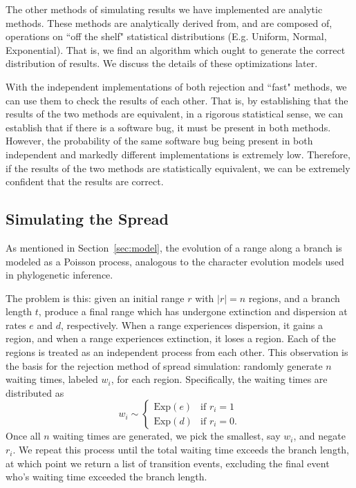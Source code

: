 \documentclass{article}
\begin{document}
The other methods of simulating results we have implemented are analytic
methods.
These methods are analytically derived from, and are composed of, operations on
``off the shelf" statistical distributions (E.g. Uniform, Normal, Exponential).
That is, we find an algorithm which ought to generate the correct distribution
of results.
We discuss the details of these optimizations later.

With the independent implementations of both rejection and ``fast" methods, we
can use them to check the results of each other.
That is, by establishing that the results of the two methods are equivalent, in
a rigorous statistical sense, we can establish that if there is a software bug,
it must be present in both methods.
However, the probability of the same software bug being present in both
independent and markedly different implementations is extremely low.
Therefore, if the results of the two methods are statistically equivalent, we
can be extremely confident that the results are correct.

\subsection{Simulating the Spread}

As mentioned in Section~\ref{sec:model}, the evolution of a range along a
branch is modeled as a Poisson process, analogous to the character evolution
models used in phylogenetic inference.

The problem is this: given an initial range \( r \) with \( |r| = n \) regions,
and a branch length \( t \), produce a final range which has undergone
extinction and dispersion at rates \( e \) and \( d \), respectively.
When a range experiences dispersion, it gains a region, and when a range
experiences extinction, it loses a region. 
Each of the regions is treated as an independent process from each other.
This observation is the basis for the rejection method of spread simulation:
randomly generate \( n \) waiting times, labeled \( w_i \), for each region.
Specifically, the waiting times are distributed as
\begin{equation}
	\label{eq:exp-rejection} w_i \sim
	\begin{cases}
		\text{Exp}(e) & \text{if } r_i
		= 1                            \\ \text{Exp}(d) & \text{if } r_i = 0.
	\end{cases}
\end{equation}
Once all $n$ waiting times are generated, we pick the smallest, say $w_i$, and
negate $r_i$.
We repeat this process until the total waiting time exceeds the branch length,
at which point we return a list of transition events, excluding the final event
who's waiting time exceeded the branch length.
\end{document}
